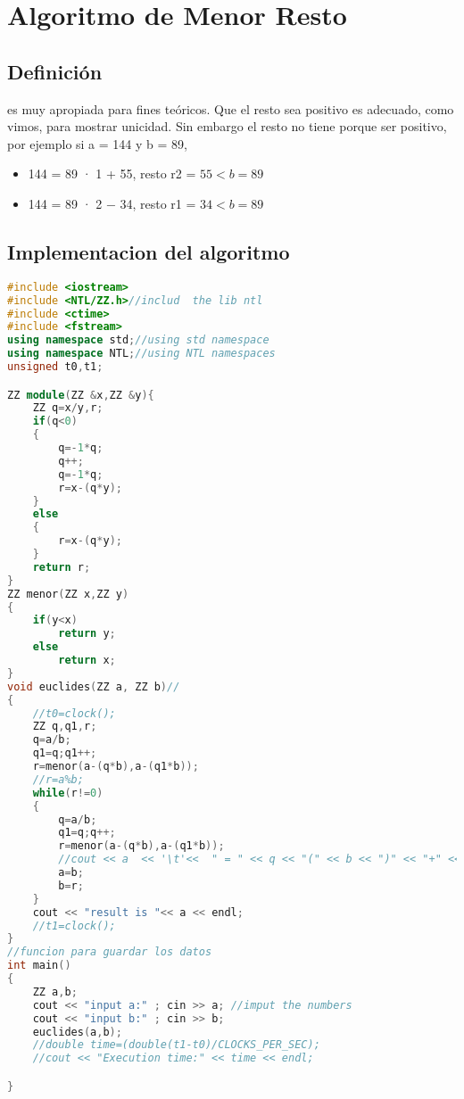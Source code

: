 \chapter{Algoritmo de Menor Resto}
\section{Definición}
es muy apropiada para fines teóricos. Que el resto sea
positivo es adecuado, como vimos, para mostrar unicidad.
Sin embargo el resto no tiene porque ser positivo, por ejemplo si a = 144 y b = 89,
\begin{itemize}
    \item 144 = 89 · 1 + 55, resto r2 = $55 < b = 89$
    \item 144 = 89 · 2 − 34, resto r1 = $34 < b = 89$

\end{itemize}

\section{Implementacion del algoritmo}
\begin{lstlisting}[language=C++]
#include <iostream>
#include <NTL/ZZ.h>//includ  the lib ntl 
#include <ctime>
#include <fstream>
using namespace std;//using std namespace 
using namespace NTL;//using NTL namespaces
unsigned t0,t1;

ZZ module(ZZ &x,ZZ &y){
    ZZ q=x/y,r;
    if(q<0)
    {
        q=-1*q;
        q++;
        q=-1*q;
        r=x-(q*y);
    }
    else 
    {
        r=x-(q*y);
    }
    return r;
}
ZZ menor(ZZ x,ZZ y)
{
    if(y<x)
        return y;
    else 
        return x;
}
void euclides(ZZ a, ZZ b)//
{
    //t0=clock();
    ZZ q,q1,r;
    q=a/b;
    q1=q;q1++;
    r=menor(a-(q*b),a-(q1*b));
    //r=a%b;
    while(r!=0)
    {
        q=a/b;
        q1=q;q++;
        r=menor(a-(q*b),a-(q1*b));
        //cout << a  << '\t'<<  " = " << q << "(" << b << ")" << "+" << r << endl;//print the euclides algorithm
        a=b;
        b=r;
    }
    cout << "result is "<< a << endl;
    //t1=clock();
}
//funcion para guardar los datos 
int main()
{
    ZZ a,b;
    cout << "input a:" ; cin >> a; //imput the numbers 
    cout << "input b:" ; cin >> b;
    euclides(a,b);
    //double time=(double(t1-t0)/CLOCKS_PER_SEC);
    //cout << "Execution time:" << time << endl;

}
\end{lstlisting}
